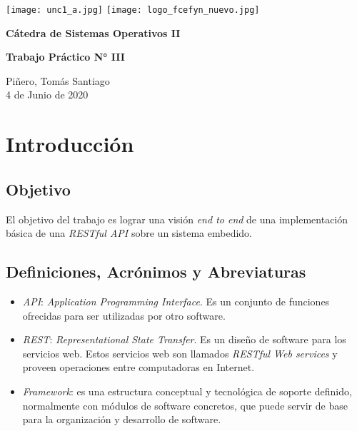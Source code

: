 \documentclass[12pt,a4paper]{article}
\renewcommand{\baselinestretch}{1} %
\begin{document}
\begin{titlepage}
    \begin{center}
      \vspace*{1cm}

      \vspace{2cm}
      \texttt{[image: unc1\_a.jpg]}
      \texttt{[image: logo\_fcefyn\_nuevo.jpg]}

      \Huge
      \textbf{Cátedra de Sistemas Operativos II}

      \vspace{3.5cm}

      \textbf{Trabajo Práctico N\si{\degree} III}

      \vfill

      \vspace{0.8cm}



      \Large
      Piñero, Tomás Santiago\\
      4 de Junio de 2020
    \end{center}
\end{titlepage}

\setcounter{secnumdepth}{3}
\setcounter{tocdepth}{5}
\tableofcontents


\newpage
\renewcommand{\baselinestretch}{1}
\setlength{\parskip}{0.5em}

\section{Introducción}
\label{intro}

\subsection{Objetivo}
\label{objetivo}
El objetivo del trabajo es lograr una visión \emph{end to end} de una
implementación básica de una \emph{RESTful API} sobre un sistema embedido.


\subsection{Definiciones, Acrónimos y Abreviaturas}
\label{daa}

\begin{itemize}
  \item \emph{API}: \emph{Application Programming Interface}. Es un conjunto
  de funciones ofrecidas para ser utilizadas por otro software.
  \item \emph{REST}: \emph{Representational State Transfer}. Es un diseño de
  software para los servicios web. Estos servicios web son llamados
  \emph{RESTful Web services} y proveen operaciones entre computadoras en Internet.
  \cite{restful}
  \item \emph{Framework}: es una estructura conceptual y tecnológica de soporte
  definido, normalmente con módulos de software concretos, que puede servir de
  base para la organización y desarrollo de software.\cite{framework}
\end{itemize}
\end{document}
